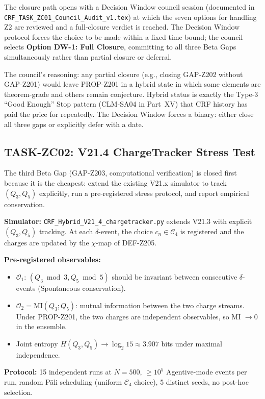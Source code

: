 \documentclass[12pt, a4paper]{article}
\begin{document}
The closure path opens with a Decision Window council session
(documented in \texttt{CRF\_TASK\_ZC01\_Council\_Audit\_v1.tex}) at
which the seven options for handling Z2 are reviewed and a
full-closure verdict is reached. The Decision Window protocol forces
the choice to be made within a fixed time bound; the council selects
\textbf{Option DW-1: Full Closure}, committing to all three Beta
Gaps simultaneously rather than partial closure or deferral.

\begin{keybox}[title={DW-1 Full-Closure Verdict (TASK-ZC01)}]
The council's reasoning: any partial closure (e.g., closing GAP-Z202
without GAP-Z201) would leave PROP-Z201 in a hybrid state in which
some elements are theorem-grade and others remain conjecture. Hybrid
status is exactly the Type-3 ``Good Enough'' Stop pattern (CLM-SA04
in Part~XV) that CRF history has paid the price for repeatedly.
The Decision Window forces a binary: either close all three gaps or
explicitly defer with a date.
\end{keybox}

\subsection{TASK-ZC02: V21.4 ChargeTracker Stress Test}

The third Beta Gap (GAP-Z203, computational verification) is closed
first because it is the cheapest: extend the existing V21.x simulator
to track $(Q_3, Q_5)$ explicitly, run a pre-registered stress
protocol, and report empirical conservation.

\begin{formalbox}[title={Stress Protocol (TASK-ZC02)}]
\textbf{Simulator:} \texttt{CRF\_Hybrid\_V21\_4\_chargetracker.py}
extends V21.3 with explicit $(Q_3, Q_5)$ tracking. At each
$\delta$-event, the choice $c_n \in \mathcal{C}_4$ is registered and
the charges are updated by the $\chi$-map of DEF-Z205.

\textbf{Pre-registered observables:}
\begin{itemize}[leftmargin=*]
\item $\mathcal{O}_1$: $(Q_3 \bmod 3, Q_5 \bmod 5)$ should be
  invariant between consecutive $\delta$-events (Spontaneous
  conservation).
\item $\mathcal{O}_2 = \mathrm{MI}(Q_3; Q_5)$: mutual information
  between the two charge streams. Under PROP-Z201, the two charges
  are independent observables, so MI $\to 0$ in the ensemble.
\item Joint entropy $H(Q_3, Q_5) \to \log_2 15 \approx 3.907$ bits
  under maximal independence.
\end{itemize}

\textbf{Protocol:} 15 independent runs at $N = 500$,
$\ge 10^5$ Agentive-mode events per run, random Pāli scheduling
(uniform $\mathcal{C}_4$ choice), 5 distinct seeds, no
post-hoc selection.
\end{formalbox}
\end{document}
